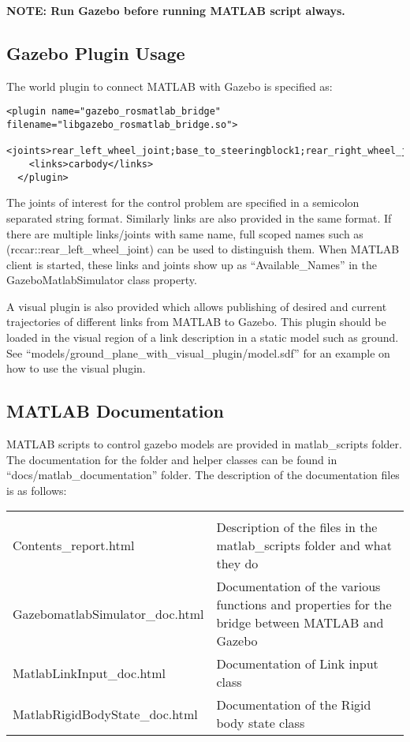 \documentclass[letterpaper,10pt]{article}
\begin{document}
\textbf{NOTE: Run Gazebo before running MATLAB script always.}

\subsection{Gazebo Plugin Usage}
The world plugin to connect MATLAB with Gazebo is specified as:
\small
\begin{Verbatim}[frame=single]
 <plugin name="gazebo_rosmatlab_bridge" filename="libgazebo_rosmatlab_bridge.so">
    <joints>rear_left_wheel_joint;base_to_steeringblock1;rear_right_wheel_joint</joints>
    <links>carbody</links>
  </plugin>
\end{Verbatim}
\normalsize
The joints of interest for the control problem are specified in a semicolon separated string format. Similarly links are also provided in the same format. If there are multiple links/joints with same name, full scoped names such as (rccar::rear\_left\_wheel\_joint) can be used to distinguish them. When MATLAB client is started, these links and joints show up as ``Available\_Names'' in the GazeboMatlabSimulator class property.

A visual plugin is also provided which allows publishing of desired and current trajectories of different links from MATLAB to Gazebo. This plugin should be loaded in the visual region of a link description in a static model such as ground. See ``models/ground\_plane\_with\_visual\_plugin/model.sdf'' for an example on how to use the visual plugin.

\subsection{MATLAB Documentation}
MATLAB scripts to control gazebo models are provided in matlab\_scripts folder. The documentation for the folder and helper classes can be found in ``docs/matlab\_documentation'' folder.
The description of the documentation files is as follows:

     \begin{table}[h!]
	\begin{tabular}{|p{}|p{}|}
	  \hline\\
	  Contents\_report.html & Description of the files in the matlab\_scripts folder and what they do\\ \hline
	  GazebomatlabSimulator\_doc.html & Documentation of the various functions and properties for the bridge between MATLAB and Gazebo\\ \hline
	   MatlabLinkInput\_doc.html & Documentation of Link input class \\ \hline
	   MatlabRigidBodyState\_doc.html & Documentation of the Rigid body state class\\ \hline
	\end{tabular}
      \end{table}
\end{document}
